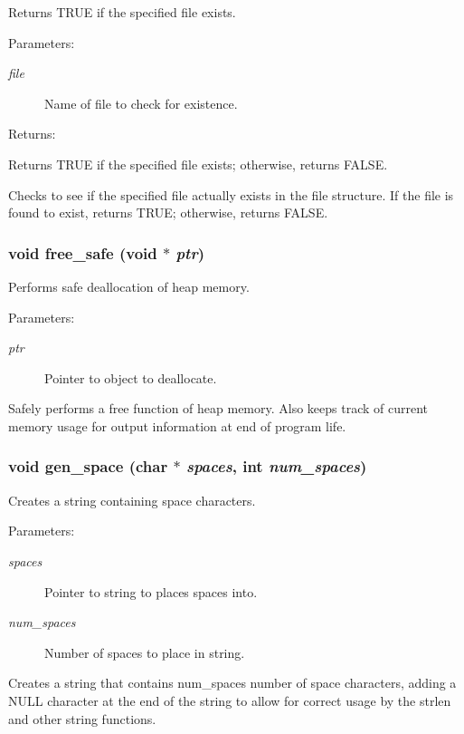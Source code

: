 Returns TRUE if the specified file exists.

\begin{Desc}
\item[Parameters: ]\par
\begin{description}
\item[{\em 
file}]Name of file to check for existence. \end{description}
\end{Desc}
\begin{Desc}
\item[Returns: ]\par
Returns TRUE if the specified file exists; otherwise, returns FALSE.\end{Desc}
Checks to see if the specified file actually exists in the file structure. If the file is found to exist, returns TRUE; otherwise, returns FALSE. 
\subsubsection{\setlength{\rightskip}{0pt plus 5cm}void free\_\-safe (void $\ast$ {\em ptr})}\label{util_8h_a10}


Performs safe deallocation of heap memory.

\begin{Desc}
\item[Parameters: ]\par
\begin{description}
\item[{\em 
ptr}]Pointer to object to deallocate.\end{description}
\end{Desc}
Safely performs a free function of heap memory. Also keeps track of current memory usage for output information at end of program life. 
\subsubsection{\setlength{\rightskip}{0pt plus 5cm}void gen\_\-space (char $\ast$ {\em spaces}, int {\em num\_\-spaces})}\label{util_8h_a11}


Creates a string containing space characters.

\begin{Desc}
\item[Parameters: ]\par
\begin{description}
\item[{\em 
spaces}]Pointer to string to places spaces into. \item[{\em 
num\_\-spaces}]Number of spaces to place in string.\end{description}
\end{Desc}
Creates a string that contains num\_\-spaces number of space characters, adding a NULL character at the end of the string to allow for correct usage by the strlen and other string functions. 

